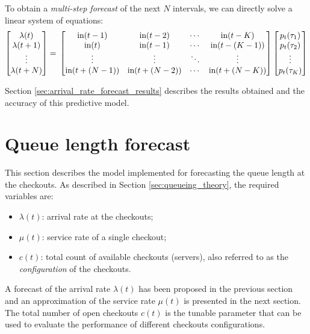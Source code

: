 To obtain a \emph{multi-step forecast} of the next \( N \) intervals, we can directly solve a linear system of equations:
\begin{equation}
  \begin{bmatrix}
    \lambda(t)   \\
    \lambda(t+1) \\
    \vdots       \\
    \lambda(t+N)
  \end{bmatrix} =  \\
  \begin{bmatrix}
    \text{in}(t-1)     & \text{in}(t-2)     & \cdots & \text{in}(t-K)     \\
    \text{in}(t)       & \text{in}(t-1)     & \cdots & \text{in}(t-(K-1)) \\
    \vdots             & \vdots             & \ddots & \vdots             \\
    \text{in}(t+(N-1)) & \text{in}(t+(N-2)) & \cdots & \text{in}(t+(N-K))
  \end{bmatrix}
  \begin{bmatrix}
    p_t(\tau_1) \\
    p_t(\tau_2) \\
    \vdots      \\
    p_t(\tau_K)
  \end{bmatrix}
\end{equation}

Section \ref{sec:arrival_rate_forecast_results} describes the results obtained and the accuracy of this predictive model.

\section{Queue length forecast}
\label{sec:queue_length_forecast}

This section describes the model implemented for forecasting the queue length at the checkouts. As described in Section \ref{sec:queueing_theory}, the required variables are:
\begin{itemize}
  \item \( \lambda(t) \): arrival rate at the checkouts;
  \item \( \mu(t) \): service rate of a single checkout;
  \item \( c(t) \): total count of available checkouts (servers), also referred to as the \emph{configuration} of the checkouts.
\end{itemize}

A forecast of the arrival rate \( \lambda(t) \) has been proposed in the previous section and an approximation of the service rate \( \mu(t) \) is presented in the next section. The total number of open checkouts \( c(t) \) is the tunable parameter that can be used to evaluate the performance of different checkouts configurations.

